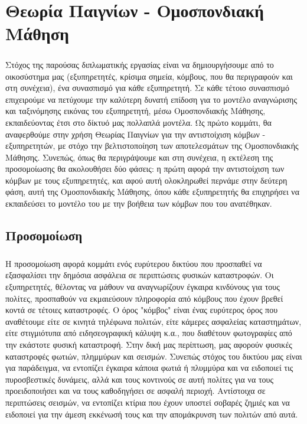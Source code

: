 \chapter{Θεωρία Παιγνίων - Ομοσπονδιακή Μάθηση}

\vspace{-0.5cm}

\paragraph{}Στόχος της παρούσας διπλωματικής εργασίας είναι να δημιουργήσουμε από το οικοσύστημα μας (εξυπηρετητές, κρίσιμα σημεία, κόμβους, που θα περιγραφούν και στη συνέχεια), ένα συνασπισμό για κάθε εξυπηρετητή. Σε κάθε τέτοιο συνασπισμό επιχειρούμε να πετύχουμε την καλύτερη δυνατή επίδοση για το μοντέλο αναγνώρισης και ταξινόμησης εικόνας του εξυπηρετητή, μέσω Ομοσπονδιακής Μάθησης, εκπαιδεύοντας έτσι στο δίκτυό μας πολλαπλά μοντέλα. Ως πρώτο κομμάτι, θα αναφερθούμε στην χρήση Θεωρίας Παιγνίων για την αντιστοίχιση κόμβων - εξυπηρετητών, με στόχο την βελτιστοποίηση των αποτελεσμάτων της Ομοσπονδιακής Μάθησης. Συνεπώς, όπως θα περιγράψουμε και στη συνέχεια, η εκτέλεση της προσομοίωσης θα ακολουθήσει δύο φάσεις: η πρώτη αφορά την αντιστοίχιση των κόμβων με τους εξυπηρετητές, και αφού αυτή ολοκληρωθεί περνάμε στην δεύτερη φάση, αυτή της Ομοσπονδιακής Μάθησης, όπου κάθε εξυπηρετητής θα επιχηρήσει να εκπαιδεύσει το μοντέλο του με την βοήθεια των κόμβων που του ανατέθηκαν.

\vspace{-0.5cm}

\section{Προσομοίωση}

\vspace{-0.2cm}

\paragraph{} Η προσομοίωση αφορά κομμάτι ενός ευρύτερου δικτύου που προσπαθεί να εξασφαλίσει την δημόσια ασφάλεια σε περιπτώσεις φυσικών καταστροφών. Οι εξυπηρετητές, θέλοντας να μάθουν να αναγνωρίζουν έγκαιρα κινδύνους για τους πολίτες, προσπαθούν να εκμαιεύσουν πληροφορία από κόμβους που έχουν βρεθεί κοντά σε τέτοιες καταστροφές. Ο όρος "κόμβος" είναι ένας ευρύτερος όρος που αναθέτουμε είτε σε κινητά τηλέφωνα πολιτών, είτε κάμερες ασφαλείας καταστημάτων, είτε στιγμιότυπα από ειδησεογραφική κάλυψη κ.α., που διαθέτουν φωτογραφίες από την εκάστοτε φυσική καταστροφή. Στην δική μας περίπτωση, μας αφορούν φυσικές καταστροφές φωτιών, πλημμύρων και σεισμών. Συνεπώς στόχος του δικτύου μας είναι για παράδειγμα, να εντοπίζει έγκαιρα κάποια φωτιά ή πλυμμύρα και να ειδοποιεί τις πυροσβεστικές δυνάμεις, αλλά και τους κοντινούς σε αυτή πολίτες για να τους προειδοποιήσει και να τους καθοδηγήσει σε ασφαλή περιοχή. Αντίστοιχα σε περιπτώσεις σεισμών, να εντοπίζει κτίρια που έχουν υποστεί σοβαρές ζημιές και να ειδοποιεί για την άμεση εκκένωσή τους και την απομάκρυνση των πολιτών από αυτά. 

